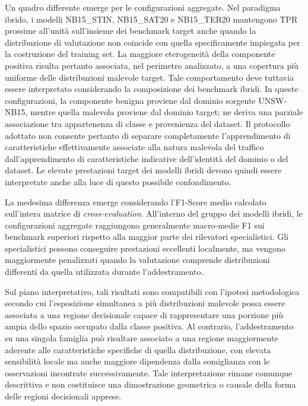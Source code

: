 Un quadro differente emerge per le configurazioni aggregate.
Nel paradigma ibrido, i modelli NB15\_STIN, NB15\_SAT20 e NB15\_TER20 mantengono TPR prossime all'unità sull'insieme dei benchmark target anche quando la distribuzione di valutazione non coincide con quella specificamente impiegata per la costruzione del training set.
La maggiore eterogeneità della componente positiva risulta pertanto associata, nel perimetro analizzato, a una copertura più uniforme delle distribuzioni malevole target.
Tale comportamento deve tuttavia essere interpretato considerando la composizione dei benchmark ibridi. In queste configurazioni, la componente benigna proviene dal dominio sorgente UNSW-NB15, mentre quella malevola proviene dal dominio target; ne deriva una parziale associazione tra appartenenza di classe e provenienza del dataset. Il protocollo adottato non consente pertanto di separare completamente l'apprendimento di caratteristiche effettivamente associate alla natura malevola del traffico dall'apprendimento di caratteristiche indicative dell'identità del dominio o del dataset. Le elevate prestazioni target dei modelli ibridi devono quindi essere interpretate anche alla luce di questo possibile confondimento.

La medesima differenza emerge considerando l'F1-Score medio calcolato sull'intera matrice di \textit{cross-evaluation}.
All'interno del gruppo dei modelli ibridi, le configurazioni aggregate raggiungono generalmente macro-medie F1 sui benchmark superiori rispetto alla maggior parte dei rilevatori specialistici.
Gli specialistici possono conseguire prestazioni eccellenti localmente, ma vengono maggiormente penalizzati quando la valutazione comprende distribuzioni differenti da quella utilizzata durante l'addestramento.

Sul piano interpretativo, tali risultati sono compatibili con l'ipotesi metodologica secondo cui l'esposizione simultanea a più distribuzioni malevole possa essere associata a una regione decisionale capace di rappresentare una porzione più ampia dello spazio occupato dalla classe positiva.
Al contrario, l'addestramento su una singola famiglia può risultare associato a una regione maggiormente aderente alle caratteristiche specifiche di quella distribuzione, con elevata sensibilità locale ma anche maggiore dipendenza dalla somiglianza con le osservazioni incontrate successivamente.
Tale interpretazione rimane comunque descrittiva e non costituisce una dimostrazione geometrica o causale della forma delle regioni decisionali apprese.

